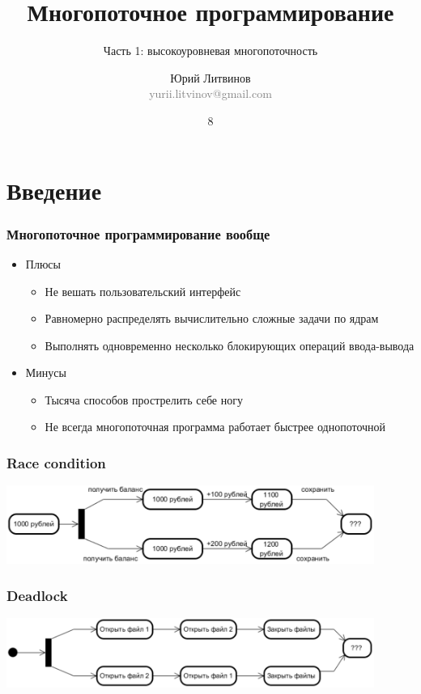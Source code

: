 \documentclass[xetex,mathserif,serif]{beamer}
\title{Многопоточное программирование}
\subtitle{Часть 1: высокоуровневая многопоточность}
\author[Юрий Литвинов]{Юрий Литвинов\\\small{\textcolor{gray}{yurii.litvinov@gmail.com}}}
\date{8}
\begin{document}
	\frame{\titlepage}

	\section{Введение}

	\begin{frame}
		\frametitle{Многопоточное программирование вообще}
		\begin{itemize}
			\item Плюсы
			\begin{itemize}
				\item Не вешать пользовательский интерфейс
				\item Равномерно распределять вычислительно сложные задачи по ядрам
				\item Выполнять одновременно несколько блокирующих операций ввода-вывода
			\end{itemize}
			\item Минусы
			\begin{itemize}
				\item Тысяча способов прострелить себе ногу
				\item Не всегда многопоточная программа работает быстрее однопоточной
			\end{itemize}
		\end{itemize}
	\end{frame}

	\begin{frame}
		\frametitle{Race condition}
		\begin{center}
			\includegraphics[width=0.9\textwidth]{raceCondition.png}
		\end{center}
	\end{frame}

	\begin{frame}
		\frametitle{Deadlock}
		\begin{center}
			\includegraphics[width=0.9\textwidth]{deadlock.png}
		\end{center}
	\end{frame}
\end{document}
